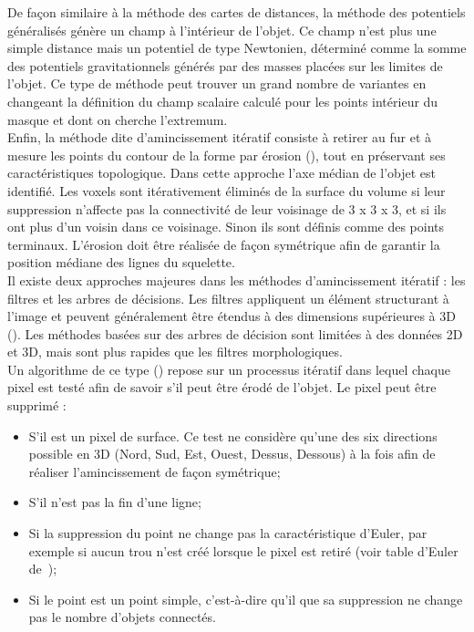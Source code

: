 De façon similaire à la méthode des cartes de distances, la méthode des potentiels généralisés génère un champ à l’intérieur de l’objet. Ce champ n’est plus une simple distance mais un potentiel de type Newtonien, déterminé comme la somme des potentiels gravitationnels générés par des masses placées sur les limites de l’objet. Ce type de méthode peut trouver un grand nombre de variantes en changeant la définition du champ scalaire calculé pour les points intérieur du masque et dont on cherche l’extremum. \\
Enfin, la méthode dite d’amincissement itératif consiste à retirer au fur et à mesure les points du contour de la forme par érosion (\cite{Palagyi2002}), tout en préservant ses caractéristiques topologique. Dans cette approche l’axe médian de l’objet est identifié. Les voxels sont itérativement éliminés de la surface du volume si leur suppression n’affecte pas la connectivité de leur voisinage de 3 x 3 x 3, et si ils ont plus d’un voisin dans ce voisinage. Sinon ils sont définis comme des points terminaux. L’érosion doit être réalisée de façon symétrique afin de garantir la position médiane des lignes du squelette.\\
Il existe deux approches majeures dans les méthodes d’amincissement itératif : les filtres et  les arbres de décisions. Les filtres appliquent un élément structurant à l’image et peuvent généralement être étendus à des dimensions supérieures à 3D  (\cite{Jonker2000}). Les méthodes basées sur des arbres de décision sont limitées à des données 2D et 3D, mais sont plus rapides que les filtres morphologiques. \\
Un algorithme de ce type (\cite{Lee1994}) repose sur un processus itératif dans lequel chaque pixel est testé afin de savoir s’il peut être érodé de l’objet. Le pixel peut être supprimé : 
\begin{itemize}
\item S’il est un pixel de surface. Ce test ne considère qu’une des six directions possible en 3D (Nord, Sud, Est, Ouest, Dessus, Dessous) à la fois afin de réaliser l’amincissement de façon symétrique;
\item S’il n’est pas la fin d’une ligne;
\item Si la suppression du point ne change pas la caractéristique d’Euler, par exemple si aucun trou n’est créé lorsque le pixel est retiré (voir table d’Euler de~\cite{Lee1994});
\item Si le point est un point simple, c’est-à-dire qu’il que sa suppression ne change pas le nombre d’objets connectés.
\end{itemize}
